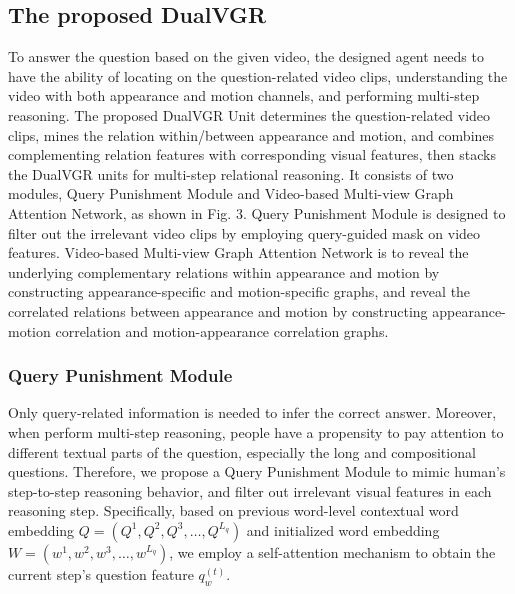 \documentclass[journal]{IEEEtran}
\begin{document}
\subsection{The proposed DualVGR} 
To answer the question based on the given video, the designed agent needs to have the ability of locating on the question-related video clips, understanding the video with both appearance and motion channels, and performing multi-step reasoning. The proposed DualVGR Unit determines the question-related video clips, mines the relation within/between appearance and motion, and combines complementing relation features with corresponding visual features, then stacks the DualVGR units for multi-step relational reasoning. It consists of two modules, Query Punishment Module and Video-based Multi-view Graph Attention Network, as shown in Fig. 3. Query Punishment Module is designed to filter out the irrelevant video clips by employing query-guided mask on video features. Video-based Multi-view Graph Attention Network is to reveal the underlying complementary relations within appearance and motion by constructing appearance-specific and motion-specific graphs, and reveal the correlated relations between appearance and motion by constructing appearance-motion correlation and motion-appearance correlation graphs.
\subsubsection{Query Punishment Module}
Only query-related information is needed to infer the correct answer. Moreover, when perform multi-step reasoning, people have a propensity to pay attention to different textual parts of the question, especially the long and compositional questions. Therefore, we propose a Query Punishment Module to mimic human's step-to-step reasoning behavior, and filter out irrelevant visual features in each reasoning step. Specifically, based on previous word-level contextual word embedding $Q = \left(Q^1, Q^2, Q^3, \dots, Q^{L_q}\right)$ and initialized word embedding $W = \left(w^1, w^2, w^3, \dots, w^{L_q}\right)$, we employ a self-attention mechanism to obtain the current step's question feature $q^{\left(t\right)}_w$.
\end{document}
